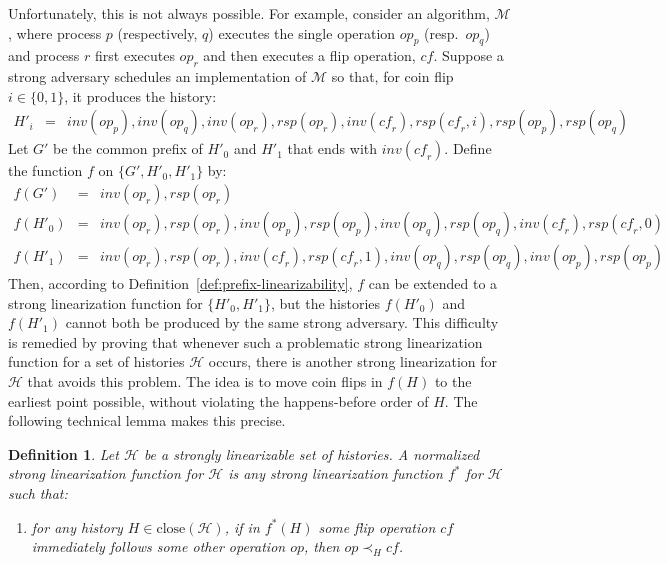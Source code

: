 \documentclass[11pt,letterpaper]{article}
\newtheorem{definition}[theorem]{Definition}
\newcommand{\HH}{\mathcal{H}}
\newcommand{\MM}{\mathcal{M}}
\newcommand{\close}[1]{\ensuremath{\text{close}\left(#1\right)}}
\newcommand{\op}{\ensuremath{\mathit{op}}}
\newcommand{\inv}[1]{\ensuremath{inv(#1)}}
\newcommand{\rsp}[1]{\ensuremath{rsp(#1)}}
\begin{document}
\newcommand{\fl}{\mathit{cf}}
Unfortunately, this is not always possible.
For example, consider an algorithm, $\MM$, where
process $p$ (respectively, $q$) executes the single operation $op_p$ (resp.\ $op_q$)
and process $r$ first executes $op_r$ and then executes a flip operation, $\fl$.
Suppose a strong adversary schedules an implementation of $\MM$
so that, for coin flip $i \in \{0,1\}$, it produces the history:
\begin{eqnarray*}
H'_i &=& \inv{op_p}, \inv{op_q}, \inv{op_r}, \rsp{op_r}, \inv{\fl_r}, \rsp{\fl_r, i}, \rsp{op_p}, \rsp{op_q}
\end{eqnarray*}
Let $G'$ be the common prefix of $H'_0$ and $H'_1$ that ends with \inv{\fl_r}.
Define the function $f$ on $\{G', H'_0, H'_1\}$ by:
\begin{eqnarray*}
f(G') &=& \inv{op_r}, \rsp{op_r}\\
f(H'_0) &=&  \inv{op_r}, \rsp{op_r}, \inv{op_p}, \rsp{op_p}, \inv{op_q}, \rsp{op_q}, \inv{\fl_r}, \rsp{\fl_r, 0}\\
f(H'_1) &=&  \inv{op_r}, \rsp{op_r}, \inv{\fl_r}, \rsp{\fl_r, 1}, \inv{op_q}, \rsp{op_q}, \inv{op_p}, \rsp{op_p}
\end{eqnarray*}
Then, according to Definition~\ref{def:prefix-linearizability},
$f$ can be extended to a strong linearization function for $\{H'_0, H'_1 \}$,
but the histories $f(H'_0)$ and $f(H'_1)$ cannot both be produced by the same strong adversary.
This difficulty is remedied by proving that whenever such a problematic strong linearization function
for a set of histories $\HH$ occurs,
there is another strong linearization for $\HH$ that avoids this problem.
The idea is to move coin flips in $f(H)$ to the earliest point possible,
without violating the happens-before order of $H$.
The following technical lemma makes this precise.

\begin{definition}\label{def:norm-pref-lin}
Let $\HH$ be a strongly linearizable set of histories.
A \emph{normalized strong linearization function for $\HH$} is any
strong linearization function $f^\ast$ for $\HH$
such that:
  \vspace{-3pt}
  \begin{enumerate}
   \item[(N)] for any history $H\in \close{\HH}$, if in $f^\ast(H)$ some flip operation $\fl$ immediately follows
some other operation $\op$, then $\op \prec_H \fl$.
  \end{enumerate}
\end{definition}
\end{document}
